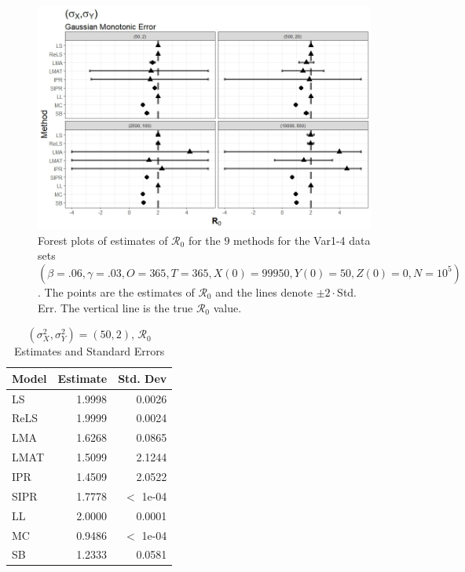 \documentclass[12pt]{article}
\newcommand{\xxsir}{\ensuremath{9} } %
\newcommand{\rr}{\ensuremath{\mathcal{R}_0}}
\begin{document}
\begin{figure}[H]
	\begin{center}
		\includegraphics[scale=0.5]{images/var_nm.jpeg}
		\caption{Forest plots of estimates of $\rr$ for the \xxsir methods for the Var1-4 data sets $(\beta=.06, \gamma=.03, O=365, T=365, X(0)=99950, Y(0)=50, Z(0)=0, N=10^5)$.  The points are the estimates of $\rr$ and the lines denote $\pm 2\cdot $Std. Err.  The vertical line is the true $\rr$ value.}
	\end{center}
\end{figure}

\begin{table}[H]
	
	
	\centering
	\begin{tabular}[t]{l|r|r}
		\hline
		Model & Estimate & Std. Dev\\
		\hline
		LS & 1.9998 & 0.0026\\
		\hline
		ReLS & 1.9999 & 0.0024\\
		\hline
		LMA & 1.6268 & 0.0865\\
		\hline
		LMAT & 1.5099 & 2.1244\\
		\hline
		IPR & 1.4509 & 2.0522\\
		\hline
		SIPR & 1.7778 & $<$ 1e-04\\
		\hline
		LL & 2.0000 & 0.0001\\
		\hline
		MC & 0.9486 & $<$ 1e-04\\
		\hline
		SB & 1.2333 & 0.0581\\
		\hline
	\end{tabular}
	\caption{ $(\sigma^2_X, \sigma^2_Y) = (50, 2)$, $\rr$ Estimates and Standard Errors}
\end{table}
\end{document}
